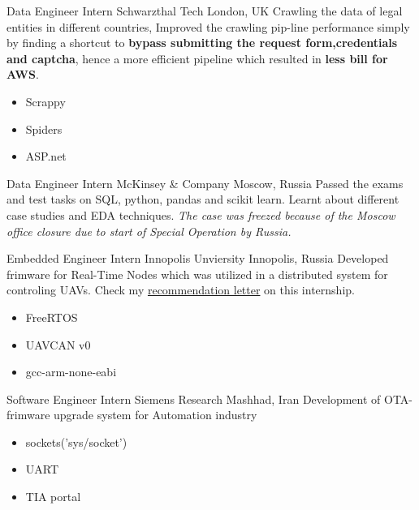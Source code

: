                 {Data Engineer Intern}
                {Schwarzthal Tech}
                {London, UK}
                {Crawling the data of legal entities in different countries, Improved the crawling pip-line performance simply by finding a shortcut to \textbf{bypass submitting the request form,credentials and captcha}, hence a more efficient pipeline which resulted in \textbf{less bill for AWS}.  } 
                {
                \begin{itemize}
                    \item Scrappy
                    \item Spiders
                    \item ASP.net 
                \end{itemize}
                }
        
        {Data Engineer Intern}
        {McKinsey \& Company}
        {Moscow, Russia}
        {Passed the exams and test tasks on SQL, python, pandas and scikit learn.
        Learnt about different case studies and EDA techniques.
        } 
        {
        \textit{The case was freezed because of the Moscow office closure due to start of Special Operation by Russia.}
        }
        

        {Embedded Engineer Intern}
        {Innopolis Unviersity}
        {Innopolis, Russia}
        {
        Developed frimware for Real-Time Nodes which was utilized in a distributed system for controling UAVs. Check my \href{https://drive.google.com/file/d/1Msw5tk7niDSDpVlNeaLCsUIQxlgREYcV/view?usp=sharing}{\color{blue} recommendation letter} on this internship.
        }
        {
        \begin{itemize}
            \item FreeRTOS
            \item UAVCAN v0
            \item gcc-arm-none-eabi
        \end{itemize}
        }


        {Software Engineer Intern}
        {Siemens Research}
        {Mashhad, Iran}
        {Development of OTA-frimware upgrade system for Automation industry} 
        {
        \begin{itemize}
            \item sockets('sys/socket')
            \item UART
            \item TIA portal 
        \end{itemize}
        }

        